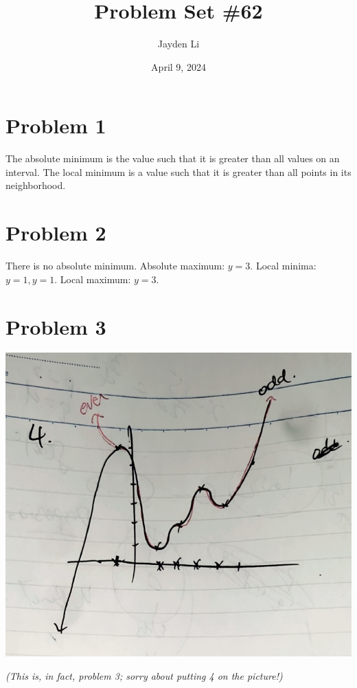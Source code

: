 \documentclass{article}
\title{Problem Set \#62}
\author{Jayden Li}
\date{April 9, 2024}
\newcommand*{\problem}[1]{\section*{Problem #1}}
\begin{document}
\fontsize{12pt}{12pt}\selectfont
\setlength{\abovedisplayskip}{0pt}
\maketitle

\problem{1}
The absolute minimum is the value such that it is greater than all values on an interval. The local minimum is a value such that it is greater than all points in its neighborhood.

\problem{2}
There is no absolute minimum. \newline
Absolute maximum: $y=3$. \newline
Local minima: $y=1,y=1$. \newline
Local maximum: $y=3$.

\problem{3}
\begin{center}
	\includegraphics*[width=0.6\linewidth]{q3.png}

	\textit{(This is, in fact, problem 3; sorry about putting 4 on the picture!)}
\end{center}
\end{document}
